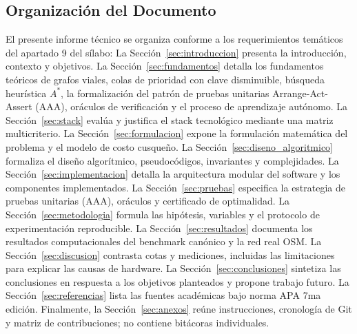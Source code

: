 \subsection{Organización del Documento}
El presente informe técnico se organiza conforme a los requerimientos temáticos del apartado 9 del sílabo:
La Sección~\ref{sec:introduccion} presenta la introducción, contexto y objetivos.
La Sección~\ref{sec:fundamentos} detalla los fundamentos teóricos de grafos viales, colas de prioridad con clave disminuible, búsqueda heurística $A^*$, la formalización del patrón de pruebas unitarias Arrange-Act-Assert (AAA), oráculos de verificación y el proceso de aprendizaje autónomo.
La Sección~\ref{sec:stack} evalúa y justifica el stack tecnológico mediante una matriz multicriterio.
La Sección~\ref{sec:formulacion} expone la formulación matemática del problema y el modelo de costo cusqueño.
La Sección~\ref{sec:diseno_algoritmico} formaliza el diseño algorítmico, pseudocódigos, invariantes y complejidades.
La Sección~\ref{sec:implementacion} detalla la arquitectura modular del software y los componentes implementados.
La Sección~\ref{sec:pruebas} especifica la estrategia de pruebas unitarias (AAA), oráculos y certificado de optimalidad.
La Sección~\ref{sec:metodologia} formula las hipótesis, variables y el protocolo de experimentación reproducible.
La Sección~\ref{sec:resultados} documenta los resultados computacionales del benchmark canónico y la red real OSM.
La Sección~\ref{sec:discusion} contrasta cotas y mediciones, incluidas las limitaciones para explicar las causas de hardware.
La Sección~\ref{sec:conclusiones} sintetiza las conclusiones en respuesta a los objetivos planteados y propone trabajo futuro.
La Sección~\ref{sec:referencias} lista las fuentes académicas bajo norma APA 7ma edición.
Finalmente, la Sección~\ref{sec:anexos} reúne instrucciones, cronología de Git y matriz de contribuciones; no contiene bitácoras individuales.
